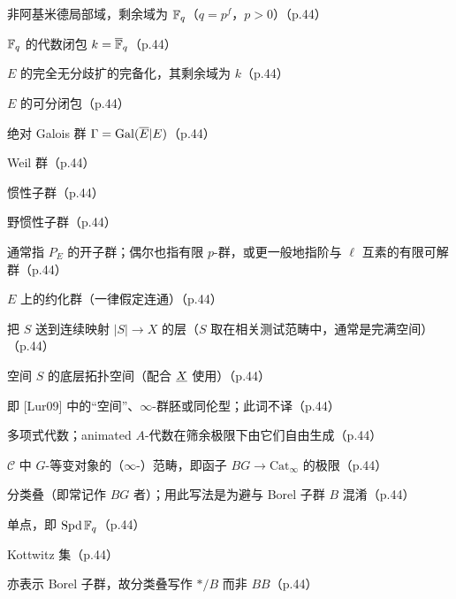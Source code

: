 \begin{description}[leftmargin=6em]
\item[$E$] 非阿基米德局部域，剩余域为 $\mathbb{F}_q$（$q=p^f$，$p>0$）（p.44）
\item[$k$] $\mathbb{F}_q$ 的代数闭包 $k=\overline{\mathbb{F}}_q$（p.44）
\item[$\breve{E}$] $E$ 的完全无分歧扩的完备化，其剩余域为 $k$（p.44）
\item[$\ol{E}$] $E$ 的可分闭包（p.44）
\item[$\Gamma$] 绝对 Galois 群 $\Gamma=\operatorname{Gal}(\overline{E}|E)$（p.44）
\item[$W_E$] Weil 群（p.44）
\item[$I_E$] 惯性子群（p.44）
\item[$P_E$] 野惯性子群（p.44）
\item[$P$] 通常指 $P_E$ 的开子群；偶尔也指有限 $p$-群，或更一般地指阶与 $\ell$ 互素的有限可解群（p.44）
\item[$G$] $E$ 上的约化群（一律假定连通）（p.44）
\item[$\ul{X}$] 把 $S$ 送到连续映射 $|S|\to X$ 的层（$S$ 取在相关测试范畴中，通常是完满空间）（p.44）
\item[$|S|$] 空间 $S$ 的底层拓扑空间（配合 $\ul{X}$ 使用）（p.44）
\item[anima] 即 [Lur09] 中的“空间”、$\infty$-群胚或同伦型；此词不译（p.44）
\item[{$A[X_1,\dots,X_n]$}] 多项式代数；animated $A$-代数在筛余极限下由它们自由生成（p.44）
\item[$\mathcal{C}^{BG}$] $\mathcal{C}$ 中 $G$-等变对象的（$\infty$-）范畴，即函子 $BG\to\mathrm{Cat}_\infty$ 的极限（p.44）
\item[$\ast/G$] 分类叠（即常记作 $BG$ 者）；用此写法是为避与 Borel 子群 $B$ 混淆（p.44）
\item[$\ast$] 单点，即 $\mathrm{Spd}\,\mathbb{F}_q$（p.44）
\item[$B(G)$] Kottwitz 集（p.44）
\item[$B$] 亦表示 Borel 子群，故分类叠写作 $\ast/B$ 而非 $BB$（p.44）
\end{description}
